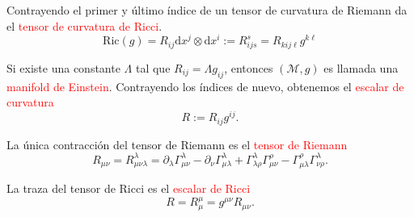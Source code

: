\documentclass[../main]{subfiles}
\begin{document}
Contrayendo el primer y último índice de un tensor de curvatura de Riemann da el \textcolor{red}{tensor de curvatura de Ricci}.
\begin{equation}
    \mathrm{Ric}(g)=R_{ij}\mathrm{d}x^j \otimes \mathrm{d}x^{i}:= R^s_{ijs}=R_{kij\ell}g^{k\ell}
\end{equation}

Si existe una constante $\Lambda$ tal que $R_{ij}=\Lambda g_{ij}$, entonces $(\mathcal{M}, g)$ es llamada una \textcolor{red}{manifold de Einstein}. Contrayendo los índices de nuevo, obtenemos el \textcolor{red}{escalar de curvatura}
\begin{equation}
    R:= R_{ij} g^{ij}.
\end{equation}

 La única contracción del tensor de Riemann es el \textcolor{red}{tensor de Riemann}
\begin{equation}
    R_{\mu\nu}=R^{\lambda}_{\mu\nu\lambda}=\partial_{\lambda}\Gamma^{\lambda}_{\mu\nu}-\partial_{\nu}\Gamma^{\lambda}_{\mu\lambda}+\Gamma^{\lambda}_{\lambda\rho}\Gamma^{\rho}_{\mu\nu}-\Gamma^{\rho}_{\mu\lambda}\Gamma^{\lambda}_{\nu\rho}.
\end{equation}

 La traza del tensor de Ricci es el \textcolor{red}{escalar de Ricci}
\begin{equation}
    R=R^{\mu}_{\mu}=g^{\mu\nu}R_{\mu\nu}.
\end{equation}
\end{document}
